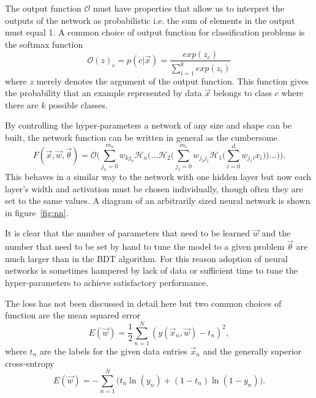 The output function $\mathcal{O}$ must have properties that allow us to
interpret the outputs of the network as probabilistic i.e. the sum of elements
in the output must equal 1. A common choice of output function for
classification problems is the softmax function
\begin{equation}
  \mathcal{O}(z)_c = p(c|\vec{x}) = \frac{exp(z_c)}{\sum_{i=1}^kexp(z_i)}
  \label{eq:softmax}
\end{equation}
where $z$ merely denotes the argument of the output function. This function
gives the probability that an example represented by data $\vec{x}$ belongs to
class $c$ where there are $k$ possible classes.

By controlling the hyper-parameters a network of any size and shape can be
built, the network function can be written in general as the cumbersome
\begin{equation}
  F(\vec{x}, \vec{w}, \vec{\theta}) = \mathcal{O} \Bigg( \sum_{j_{n}=0}^{m_{n}} w_{kj_{n}}
  \mathcal{H}_{n} \Bigg( \dots \mathcal{H}_2  \Bigg( \sum_{j_{1}=0}^{m_{1}} w_{j_{2}j_{1}} 
  \mathcal{H}_{1} \Bigg( \sum_{i=0}^{d} w_{j_{1}i} x_{i} \Bigg) \Bigg) \dots \Bigg) \Bigg).
  \label{eq:fullnn}
\end{equation}
This behaves in a similar way to the network with one hidden layer but now each
layer's width and activation must be chosen individually, though often they are
set to the same values. A diagram of an arbitrarily sized neural network is
shown in figure~\ref{fig:nn}.

It is clear that the number of parameters that need to be learned $\vec{w}$ and
the number that need to be set by hand to tune the model to a given problem
$\vec{\theta}$ are much larger than in the BDT algorithm. For this reason
adoption of neural networks is sometimes hampered by lack of data or sufficient
time to tune the hyper-parameters to achieve satisfactory performance.

The loss has not been discussed in detail here but two common choices of
function are the mean squared error
\begin{equation}
E(\vec{w}) = \frac{1}{2}\sum_{n=1}^{N}(y(\vec{x}_n, \vec{w}) - t_n)^2,
\label{eq:MSE}
\end{equation}
where $t_n$ are the labels for the given data entries $\vec{x}_n$ and the
generally superior cross-entropy~\cite{XEntropySimard}
\begin{equation}
E(\vec{w}) = - \sum_{n=1}^{N} \Bigg (t_n \ln (y_n) + (1-t_n) \ln (1-y_n) \Bigg).
\label{eq:xentropy}
\end{equation}

